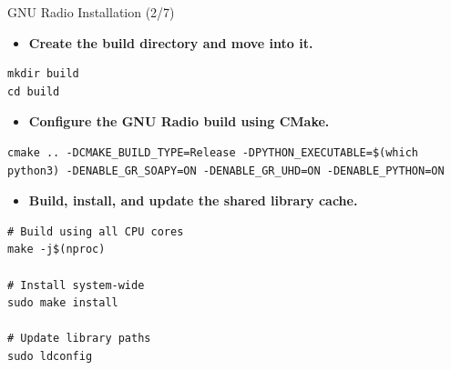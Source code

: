 \begin{frame}[fragile]{GNU Radio Installation (2/7)}

\footnotesize

\begin{itemize}
    \item \textbf{Create the build directory and move into it.}
\end{itemize}

\scriptsize
\begin{lstlisting}[frame=none,xleftmargin=2.8em,breaklines=true]
mkdir build
cd build
\end{lstlisting}

\footnotesize

\begin{itemize}
    \item \textbf{Configure the GNU Radio build using CMake.}
\end{itemize}

\scriptsize
\begin{lstlisting}[frame=none,xleftmargin=2.8em,breaklines=true]
cmake .. -DCMAKE_BUILD_TYPE=Release -DPYTHON_EXECUTABLE=$(which python3) -DENABLE_GR_SOAPY=ON -DENABLE_GR_UHD=ON -DENABLE_PYTHON=ON
\end{lstlisting}

\footnotesize

\begin{itemize}
    \item \textbf{Build, install, and update the shared library cache.}
\end{itemize}

\scriptsize
\begin{lstlisting}[frame=none,xleftmargin=2.8em]
# Build using all CPU cores
make -j$(nproc)

# Install system-wide
sudo make install

# Update library paths
sudo ldconfig
\end{lstlisting}

\end{frame}